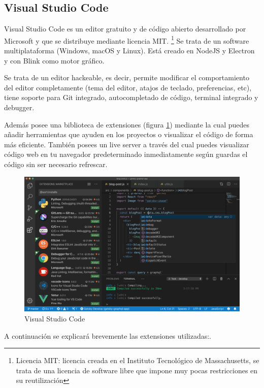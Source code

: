 \subsection{Visual Studio Code}

Visual Studio Code es un editor gratuito y de código abierto desarrollado por Microsoft y que se distribuye mediante licencia MIT. \footnote{Licencia MIT: licencia creada en el Instituto Tecnológico de Massachusetts, se trata de una licencia de software libre que impone muy pocas restricciones en su reutilización} Se trata de un software multiplataforma (Windows, macOS y Linux).
Está creado en NodeJS y Electron \cite{electron} y con Blink como motor gráfico.

Se trata de un editor hackeable, es decir, permite modificar el comportamiento del editor completamente (tema del editor, atajos de teclado, preferencias, etc), tiene soporte para Git integrado, autocompletado de código, terminal integrado y debugger.

Además posee una biblioteca de extensiones (figura \ref{fig:vscode}) mediante la cual puedes añadir herramientas que ayuden en los proyectos o visualizar el código de forma más eficiente. También posees un live server a través del cual puedes visualizar código web en tu navegador predeterminado inmediatamente según guardas el código sin ser necesario refrescar.

\begin{figure}[h]
    \centering
    \includegraphics[width=\textwidth]{include/figuras/VSCode.png}
    \caption{Visual Studio Code}
    \label{fig:vscode}
\end{figure}

A continuación se explicará brevemente las extensiones utilizadas:.

